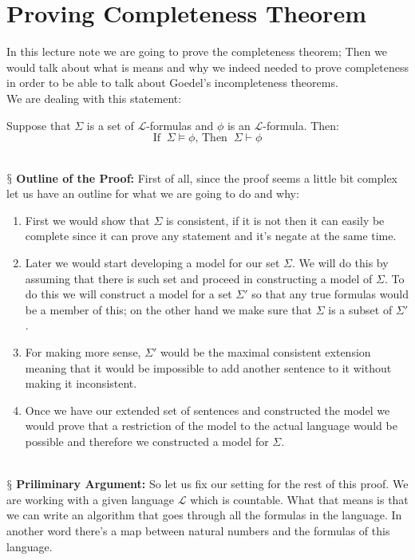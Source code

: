 \documentclass[9pt,a4paper, twocolumn]{article}
\newcounter{theo}
\newcommand{\newpoint}[1]{\ \\ \indent$\mathsection$ \textbf{#1}}
\newcommand{\curveL}{\mathcal{L}}
\begin{document}
    \section{Proving Completeness Theorem} 
        In this lecture note we are going to prove the completeness theorem; Then we would talk about what is means and why we indeed needed to prove completeness in order to be able to talk about Goedel's incompleteness theorems.
        \\
        We are dealing with this statement:
        \begin{center}
            Suppose that $\Sigma$ is a set of $\curveL$-formulas and $\phi$ is an $\curveL$-formula. Then:
            \begin{equation}
                \text{If } \ \Sigma\vDash\phi \text{, Then } \ \Sigma \vdash \phi
            \end{equation}
        \end{center}
        \newpoint{Outline of the Proof:} First of all, since the proof seems a little bit complex let us have an outline for what we are going to do and why:
        \begin{enumerate}
            \item First we would show that $\Sigma$ is consistent, if it is not then it can easily be complete since it can prove any statement and it's negate at the same time.
            \item Later we would start developing a model for our set $\Sigma$. We will do this by assuming that there is such set and proceed in constructing a model of $\Sigma$. To do this we will construct a model for a set $\Sigma'$ so that any true formulas would be a member of this; on the other hand we make sure that $\Sigma$ is a subset of $\Sigma'$.
            \item For making more sense, $\Sigma'$ would be the maximal consistent extension meaning that it would be impossible to add another sentence to it without making it inconsistent.
            \item Once we have our extended set of sentences and constructed the model we would prove that a restriction of the model to the actual language would be possible and therefore we constructed a model for $\Sigma$.
        \end{enumerate}
        \newpoint{Priliminary Argument: } So let us fix our setting for the rest of this proof. We are working with a given language $\curveL$ which is countable. What that means is that we can write an algorithm that goes through all the formulas in the language. In another word there's a map between natural numbers and the formulas of this language.
\end{document}
